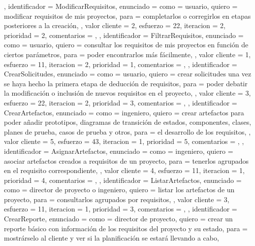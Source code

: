 \documentclass[a4paper, 12pt, spanish]{memoria}
\begin{document}
{{},{%
    identificador = ModificarRequisitos,
    enunciado     = {%
        como = {usuario},
        quiero = {modificar requisitos de mis proyectos},
        para = {completarlos o corregirlos en etapas posteriores a la creación},
    },
    valor cliente = 2,
    esfuerzo      = {2}{2},
    iteracion     = 2,
    prioridad     = 2,
    comentarios   = {},
},{%
    identificador = FiltrarRequisitos,
    enunciado     = {%
        como = {usuario},
        quiero = {consultar los requisitos de mis proyectos en función de ciertos parámetros},
        para = {poder encontrarlos más fácilmente},
    },
    valor cliente = 1,
    esfuerzo      = {1}{1},
    iteracion     = 2,
    prioridad     = 1,
    comentarios   = {},
},{%
    identificador = CrearSolicitudes,
    enunciado     = {%
        como = {usuario},
        quiero = {crear solicitudes una vez se haya hecho la primera etapa de deducción de requisitos},
        para = {poder debatir la modificación o inclusión de nuevos requisitos en el proyecto},
    },
    valor cliente = 3,
    esfuerzo      = {2}{2},
    iteracion     = 2,
    prioridad     = 3,
    comentarios   = {},
},{%
    identificador = CrearArtefactos,
    enunciado     = {%
        como = {ingeniero},
        quiero = {crear artefactos para poder añadir prototipos, diagramas de transición de estados, componentes, clases, planes de prueba, casos de prueba y otros},
        para = {el desarrollo de los requisitos},
    },
    valor cliente = 5,
    esfuerzo      = {4}{3},
    iteracion     = 1,
    prioridad     = 5,
    comentarios   = {},
},{%
    identificador = AsignarArtefactos,
    enunciado     = {%
        como = {ingeniero},
        quiero = {asociar artefactos creados a requisitos de un proyecto},
        para = {tenerlos agrupados en el requisito correspondiente},
    },
    valor cliente = 4,
    esfuerzo      = {1}{1},
    iteracion     = 1,
    prioridad     = 4,
    comentarios   = {},
},{%
    identificador = ListarArtefactos,
    enunciado     = {%
        como = {director de proyecto o ingeniero},
        quiero = {listar los artefactos de un proyecto},
        para = {consultarlos agrupados por requisitos},
    },
    valor cliente = 3,
    esfuerzo      = {1}{1},
    iteracion     = 1,
    prioridad     = 3,
    comentarios   = {},
},{%
    identificador = CrearReporte,
    enunciado     = {%
        como = {director de proyecto},
        quiero = {crear un reporte básico con información de los requisitos del proyecto y su estado},
        para = {mostrárselo al cliente y ver si la planificación se estará llevando a cabo},
}}}
\end{document}
